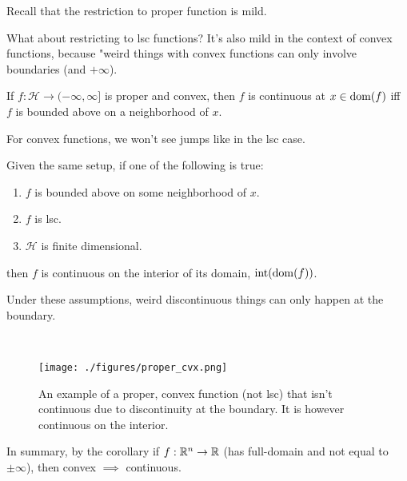 \documentclass[class=article,crop=false]{standalone}
\begin{document}
\begin{remark}
Recall that the restriction to proper function is mild.

What about restricting to lsc functions? It's also mild in the context of convex functions, because "weird things with convex functions can only involve boundaries (and $ +\infty$).
\end{remark}
\begin{thm}[8.38 BC17 ]
	If $ f: \mathcal{ H} \to (-\infty,\infty]$ is proper and convex, then $ f$ is continuous at  $ x \in \operatorname{dom}(f)$ iff $ f$ is bounded above on a neighborhood of  $ x$.
\end{thm}
\begin{note}
For convex functions, we won't see jumps like in the lsc case.
\end{note}
\begin{coro}[8.39]
Given the same setup, if one of the following is true:
\begin{enumerate}[label=(\roman*)]
	\item $ f$ is bounded above on some neighborhood of $ x$.
	\item  $ f$ is lsc.
	\item  $ \mathcal{ H}$ is finite dimensional.
\end{enumerate}
then $ f$ is continuous on the interior of its domain, $ \operatorname{int} (\operatorname{dom}(f))$.
\end{coro}
\begin{note}
Under these assumptions, weird discontinuous things can only happen at the boundary.
\end{note}
~\begin{figure}[H]
	\centering
	\texttt{[image: ./figures/proper\_cvx.png]}
	\caption{An example of a proper, convex function (not lsc) that isn't continuous due to discontinuity at the boundary. It is however continuous on the interior.}
\end{figure}
\begin{remark}
	In summary, by the corollary if $ f: \mathbb{R}^{n} \to \mathbb{R}$ (has full-domain and not equal to $ \pm \infty$), then convex $ \implies$ continuous.
\end{remark}
\end{document}

